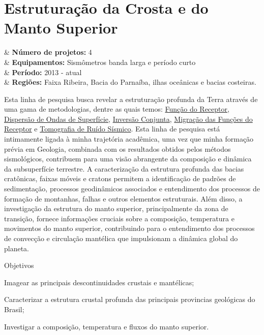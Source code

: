 \documentclass[10pt,a4paper,oneside]{book}
\begin{document}
\section{Estruturação da Crosta e do Manto Superior}

\begin{summarybox}[frametitle=\faProjectDiagram{}\quad Panorama da linha de pesquisa]
	\begin{datelist}
		\faFile* & \textbf{Número de projetos:} 4 \\
		\faBinoculars & \textbf{Equipamentos:} Sismômetros banda larga e período curto \\
		\faCalendar*[regular] & \textbf{Período:} 2013 - atual \\
		\faMapMarked* & \textbf{Regiões:} Faixa Ribeira, Bacia do Parnaíba, ilhas oceânicas e bacias costeiras. \\
	\end{datelist}
\end{summarybox}

\bigskip

Esta linha de pesquisa busca revelar a estruturação profunda da Terra através de uma gama de metodologias, dentre as quais temos: \href{https://doi.org/10.1029/JB084iB09p04749}{Função do Receptor}, \href{https://doi.org/10.1111/j.1365-246X.1990.tb04573.x}{Dispersão de Ondas de Superfície}, \href{https://doi.org/10.1046/j.1365-246x.2000.00217.x}{Inversão Conjunta}, \href{https://doi.org/10.1016/j.epsl.2013.08.025}{Migração das Funções do Receptor} e \href{https://doi.org/10.1111/j.1365-246X.2007.03374.x}{Tomografia de Ruído Sísmico}. Esta linha de pesquisa está intimamente ligada à minha trajetória acadêmica, uma vez que minha formação prévia em Geologia, combinada com os resultados obtidos pelos métodos sismológicos, contribuem para uma visão abrangente da composição e dinâmica da subsuperfície terrestre. A caracterização da estrutura profunda das bacias cratônicas, faixas móveis e cratons permitem a identificação de padrões de sedimentação, processos geodinâmicos associados e entendimento dos processos de formação de montanhas, falhas e outros elementos estruturais. Além disso, a investigação da estrutura do manto superior, principalmente da zona de transição, fornece informações cruciais sobre a composição, temperatura e movimentos do manto superior, contribuindo para o entendimento dos processos de convecção e circulação mantélica que impulsionam a dinâmica global do planeta.  

\begin{fancyenum}{\faFutbol}{Objetivos}
	\item Imagear as principais descontinuidades crustais e mantélicas;
	\item Caracterizar a estrutura crustal profunda das principais provincias geológicas do Brasil;
	\item Investigar a composição, temperatura e fluxos do manto superior.
\end{fancyenum}
\end{document}

